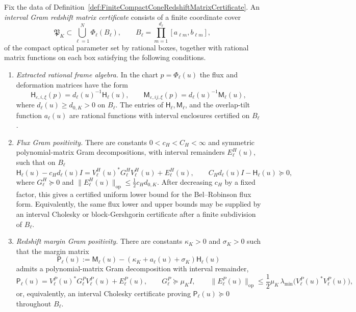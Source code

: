 \begin{definition}\label{def:IntervalGramRedshiftMatrixCertificate}
Fix the data of Definition~\ref{def:FiniteCompactConeRedshiftMatrixCertificate}.
An \emph{interval Gram redshift matrix certificate} consists of a finite
coordinate cover
\[
    \mathfrak P_K\subset \bigcup_{\ell=1}^N \Phi_\ell(B_\ell),
    \qquad
    B_\ell=\prod_{m=1}^{d_\ell}[a_{\ell m},b_{\ell m}],
\]
of the compact optical parameter set by rational boxes, together with rational
matrix functions on each box satisfying the following conditions.
\begin{enumerate}
    \item \emph{Extracted rational frame algebra.}  In the chart
    $p=\Phi_\ell(u)$ the flux and deformation matrices have the form
    \[
        \mathsf H_{\varepsilon,i,\xi}(p)
        =
        d_\ell(u)^{-1}\mathsf H_\ell(u),
        \qquad
        \mathsf M_{\varepsilon,ij,\xi}(p)
        =
        d_\ell(u)^{-1}\mathsf M_\ell(u),
    \]
    where $d_\ell(u)\ge d_{0,K}>0$ on $B_\ell$.  The entries of
    $\mathsf H_\ell,\mathsf M_\ell$, and the overlap-tilt function $a_\ell(u)$
    are rational functions with interval enclosures certified on $B_\ell$.

    \item \emph{Flux Gram positivity.}  There are constants
    $0<c_H<C_H<\infty$ and symmetric polynomial-matrix Gram decompositions,
    with interval remainders $E^H_\ell(u)$, such that on $B_\ell$
    \[
        \mathsf H_\ell(u)-c_Hd_\ell(u)I
        =
        V^H_\ell(u)^*G^H_\ell V^H_\ell(u)+E^H_\ell(u),
        \qquad
        C_Hd_\ell(u)I-\mathsf H_\ell(u)
        \succeq0,
    \]
    where $G^H_\ell\succeq0$ and
    $\|E^H_\ell(u)\|_{\mathrm{op}}\le \frac12 c_Hd_{0,K}$.
    After decreasing $c_H$ by a fixed factor, this gives a certified uniform
    lower bound for the Bel--Robinson flux form.  Equivalently, the same flux
    lower and upper bounds may be supplied by an interval Cholesky or
    block-Gershgorin certificate after a finite subdivision of $B_\ell$.

    \item \emph{Redshift margin Gram positivity.}  There are constants
    $\kappa_K>0$ and $\sigma_K>0$ such that the margin matrix
    \[
        \mathsf P_\ell(u)
        :=
        \mathsf M_\ell(u)
        -
        (\kappa_K+a_\ell(u)+\sigma_K)\mathsf H_\ell(u)
    \]
    admits a polynomial-matrix Gram decomposition with interval remainder,
    \[
        \mathsf P_\ell(u)
        =
        V^P_\ell(u)^*G^P_\ell V^P_\ell(u)+E^P_\ell(u),
        \qquad
        G^P_\ell\succeq \mu_K I,
        \qquad
        \|E^P_\ell(u)\|_{\mathrm{op}}
        \le
        \frac12\mu_K\,\lambda_{\min}\!\bigl(V^P_\ell(u)^*V^P_\ell(u)\bigr),
    \]
    or, equivalently, an interval Cholesky certificate proving
    $\mathsf P_\ell(u)\succeq0$ throughout $B_\ell$.


\end{enumerate}
\end{definition}

